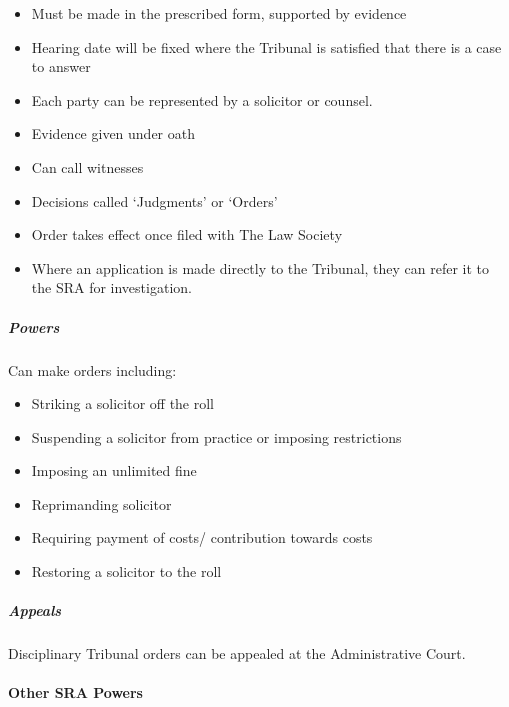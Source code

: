 \documentclass[
]{article}
\providecommand{\tightlist}{%
  \setlength{\itemsep}{0pt}\setlength{\parskip}{0pt}}
\begin{document}
\begin{itemize}
\tightlist
\item
  Must be made in the prescribed form, supported by evidence
\item
  Hearing date will be fixed where the Tribunal is satisfied that there
  is a case to answer
\item
  Each party can be represented by a solicitor or counsel.
\item
  Evidence given under oath
\item
  Can call witnesses
\item
  Decisions called `Judgments' or `Orders'
\item
  Order takes effect once filed with The Law Society
\item
  Where an application is made directly to the Tribunal, they can refer
  it to the SRA for investigation.
\end{itemize}

\hypertarget{powers}{%
\subparagraph{Powers}\label{powers}}

Can make orders including:

\begin{itemize}
\tightlist
\item
  Striking a solicitor off the roll
\item
  Suspending a solicitor from practice or imposing restrictions
\item
  Imposing an unlimited fine
\item
  Reprimanding solicitor
\item
  Requiring payment of costs/ contribution towards costs
\item
  Restoring a solicitor to the roll
\end{itemize}

\hypertarget{appeals}{%
\subparagraph{Appeals}\label{appeals}}

Disciplinary Tribunal orders can be appealed at the Administrative
Court.

\hypertarget{other-sra-powers}{%
\paragraph{Other SRA Powers}\label{other-sra-powers}}
\end{document}
